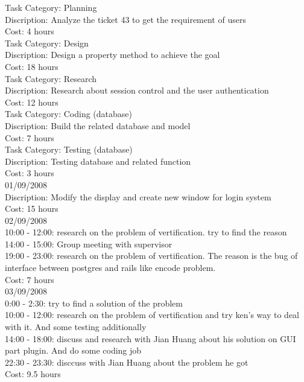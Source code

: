 \documentclass[10pt,a4,oneside]{article}
\begin{document}
Task Category: Planning\\
Discription: Analyze the ticket 43 to get the requirement of users  \\
Cost: 4 hours\\ 

Task Category: Design\\
Discription: Design a property method to achieve the goal \\
Cost: 18 hours\\

Task Category: Research\\
Discription: Research about session control and the user authentication \\
Cost: 12 hours\\

Task Category: Coding (database)  \\
Discription: Build the related database and model  \\
Cost: 7 hours\\

Task Category: Testing (database)\\
Discription:  Testing database and related function\\
Cost: 3 hours\\

01/09/2008 \\
Discription: Modify the display and create new window for login system  \\
Cost: 15 hours\\

02/09/2008 \\
10:00 - 12:00: research on the problem of vertification. try to find the reason\\
14:00 - 15:00: Group meeting with supervisor\\
19:00 - 23:00: research on the problem of vertification. The reason is the bug of interface between postgres and rails like encode problem.\\
Cost: 7 hours\\

03/09/2008\\
0:00 - 2:30: try to find a solution of the problem\\
10:00 - 12:00: research on the problem of vertification and try ken's way to deal with it. And some testing additionally\\
14:00 - 18:00: discuss and research with Jian Huang about his solution on GUI part plugin. And do some coding job\\
22:30 - 23:30: disccuss with Jian Huang about the problem he got\\
Cost: 9.5 hours\\
\end{document}
